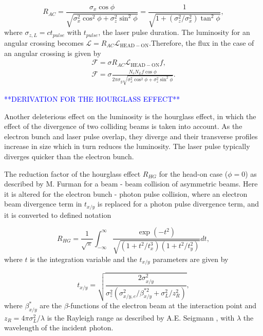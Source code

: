 \documentclass[../main.tex]{subfiles}
\begin{document}
\begin{equation}
R_{AC} = \frac{\sigma_{x}\cos\phi}{\sqrt{\sigma_{x}^{2}\cos^{2}\phi+\sigma_{z}^{2}\sin^{2}\phi}} = \frac{1}{\sqrt{1+\left(\sigma_{z}^{2}/\sigma_{x}^{2}\right)\tan^{2}\phi}},
\label{eq:angular_crossing_factor}    
\end{equation}
where $\sigma_{z,L} = ct_{pulse}$ with $t_{pulse}$, the laser pulse duration. The luminosity for an angular crossing becomes $\mathcal{L} = R_{AC}\mathcal{L}_{\mathrm{HEAD-ON}}$.Therefore, the flux in the case of an angular crossing is given by 
\begin{gather}
\mathcal{F} = \sigma R_{AC}\mathcal{L}_{\mathrm{HEAD-ON}}f, \\
\mathcal{F} = \sigma\frac{N_{e}N_{L}f\cos\phi}{2\pi\sigma_{y}\sqrt{\sigma_{x}^{2}\cos^{2}\phi + \sigma_{z}^{2}\sin^{2}\phi}}.
\label{eq:crossing_angle_flux}    
\end{gather}

\textcolor{blue}{**DERIVATION FOR THE HOURGLASS EFFECT**}

Another deleterious effect on the luminosity is the hourglass effect, in which the effect of the divergence of two colliding beams is taken into account. As the electron bunch and laser pulse overlap, they diverge and their transverse profiles increase in size which in turn reduces the luminosity. The laser pulse typically diverges quicker than the electron bunch. 

The reduction factor of the hourglass effect $R_{HG}$ for the head-on case ($\phi = 0$) as described by M. Furman \cite{furman1991hourglass} for a beam - beam collision of asymmetric beams. Here it is altered for the electron bunch - photon pulse collision, where an electron beam divergence term in $t_{x/y}$ is replaced for a photon pulse divergence term, and it is converted to defined notation 

\begin{equation}
R_{HG} = \frac{1}{\sqrt{\pi}}\int_{-\infty}^{\infty}\frac{\exp\left(-t^{2}\right)}{\sqrt{\left(1+t^{2}/t_{x}^{3}\right)\left(1+t^{2}/t_{y}^{2}\right)}}dt,
\label{eq:furman_hourglass_reduction}    
\end{equation}
where $t$ is the integration variable and the $t_{x/y}$ parameters are given by

\begin{equation}
t_{x/y} = \sqrt{\frac{2\sigma_{x/y}^{2}}{\sigma_{z}^{2}\left(\sigma_{x/y,e}^{2}/\beta_{x/y}^{*2}+\sigma_{L}^{2}/z_{R}^{2}\right)}},
\label{eq:furman_txy_parameters}    
\end{equation}
where $\beta_{x/y}^{*}$ are the $\beta$-functions of the electron beam at the interaction point and $z_{R}=4\pi\sigma_{L}^{2}/\lambda$ is the Rayleigh range as described by A.E. Seigmann \cite{siegmann1986lasers}, with $\lambda$ the wavelength of the incident photon.
\end{document}
